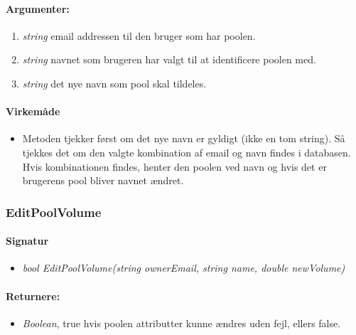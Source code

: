 \paragraph{Argumenter:}
\begin{enumerate}
	\item \textit{string} email addressen til den bruger som har poolen.
	\item \textit{string} navnet som brugeren har valgt til at identificere poolen med.
	\item \textit{string} det nye navn som pool skal tildeles.
\end{enumerate}

\paragraph{Virkemåde}
\begin{itemize}
	\item Metoden tjekker først om det nye navn er gyldigt (ikke en tom string). Så tjekkes det om den valgte kombination af email og navn findes i databasen. Hvis kombinationen findes, henter den poolen ved navn og hvis det er brugerens pool bliver navnet ændret.
\end{itemize}





\subsubsection{EditPoolVolume}%







\paragraph{Signatur}
\begin{itemize}
	\item \textit{bool EditPoolVolume(string ownerEmail, string name, double newVolume)}
\end{itemize}

\paragraph{Returnere:}
\begin{itemize}
	\item \textit{Boolean}, true hvis poolen attributter kunne ændres uden fejl, ellers false.
\end{itemize}

